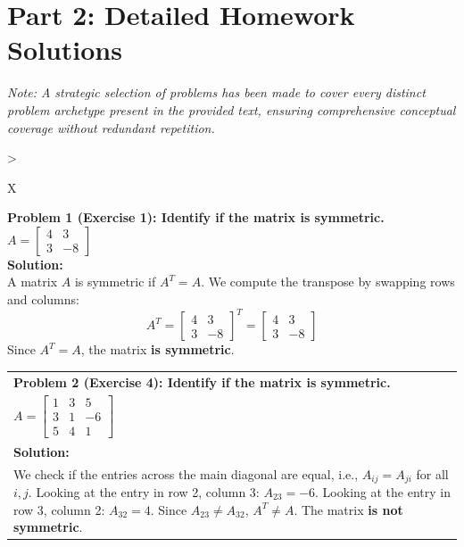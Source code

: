 \documentclass[11pt, letterpaper]{article}
\theoremstyle{definition}
\theoremstyle{remark}
\begin{document}
\newpage
\section{Part 2: Detailed Homework Solutions}
\textit{Note: A strategic selection of problems has been made to cover every distinct problem archetype present in the provided text, ensuring comprehensive conceptual coverage without redundant repetition.}

\renewcommand{\arraystretch}{1.5}
\begin{tabularx}{\textwidth}{>{\raggedright\arraybackslash}X}
\toprule
\textbf{Problem 1 (Exercise 1): Identify if the matrix is symmetric.} \\
$A = \begin{bmatrix} 4 & 3 \\ 3 & -8 \end{bmatrix}$ \\
\midrule
\textbf{Solution:} \\
A matrix $A$ is symmetric if $A^T = A$. We compute the transpose by swapping rows and columns:
\[ A^T = \begin{bmatrix} 4 & 3 \\ 3 & -8 \end{bmatrix}^T = \begin{bmatrix} 4 & 3 \\ 3 & -8 \end{bmatrix} \]
Since $A^T = A$, the matrix \textbf{is symmetric}. \\
\bottomrule
\end{tabularx}
\vspace{1em}

\begin{tabularx}{\textwidth}{>{\raggedright\arraybackslash}X}
\toprule
\textbf{Problem 2 (Exercise 4): Identify if the matrix is symmetric.} \\
$A = \begin{bmatrix} 1 & 3 & 5 \\ 3 & 1 & -6 \\ 5 & 4 & 1 \end{bmatrix}$ \\
\midrule
\textbf{Solution:} \\
We check if the entries across the main diagonal are equal, i.e., $A_{ij} = A_{ji}$ for all $i, j$.
Looking at the entry in row 2, column 3: $A_{23} = -6$.
Looking at the entry in row 3, column 2: $A_{32} = 4$.
Since $A_{23} \neq A_{32}$, $A^T \neq A$. The matrix \textbf{is not symmetric}. \\
\bottomrule
\end{tabularx}
\vspace{1em}
\end{document}
